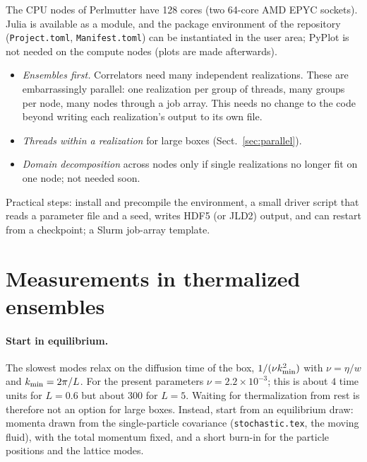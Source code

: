 \documentclass[11pt,aps,preprint,nofootinbib,superscriptaddress,tightenlines]{revtex4-2}
\def\Sect#1{Sect.~\ref{#1}}
\let\oldparagraph\paragraph
\renewcommand{\paragraph}{\par\bigskip\oldparagraph}
\begin{document}
The CPU nodes of Perlmutter have 128 cores (two 64-core AMD EPYC sockets).
Julia is available as a module, and the package environment of the repository
(\texttt{Project.toml}, \texttt{Manifest.toml}) can be instantiated in the user
area; PyPlot is not needed on the compute nodes (plots are made afterwards).
\begin{itemize}
\item \emph{Ensembles first.}  Correlators need many independent realizations.
  These are embarrassingly parallel: one realization per group of threads,
  many groups per node, many nodes through a job array.  This needs no change
  to the code beyond writing each realization's output to its own file.
\item \emph{Threads within a realization} for large boxes (\Sect{sec:parallel}).
\item \emph{Domain decomposition} across nodes only if single realizations no
  longer fit on one node; not needed soon.
\end{itemize}
Practical steps: install and precompile the environment, a small driver
script that reads a parameter file and a seed, writes HDF5 (or JLD2) output,
and can restart from a checkpoint; a Slurm job-array template.

\section{Measurements in thermalized ensembles}
\label{sec:measure}

\paragraph{Start in equilibrium.}  The slowest modes relax on the diffusion
time of the box, $1/(\nu k_{\rm min}^2)$ with $\nu=\eta/w$ and $k_{\rm min}=2\pi/L$.  For the
present parameters $\nu=2.2\times10^{-3}$; this is about $4$ time units for $L=0.6$
but about $300$ for $L=5$.  Waiting for thermalization from rest is therefore
not an option for large boxes.  Instead, start from an equilibrium draw:
momenta drawn from the single-particle covariance (\texttt{stochastic.tex}, the
moving fluid), with the total momentum fixed, and a short burn-in for the
particle positions and the lattice modes.
\end{document}
